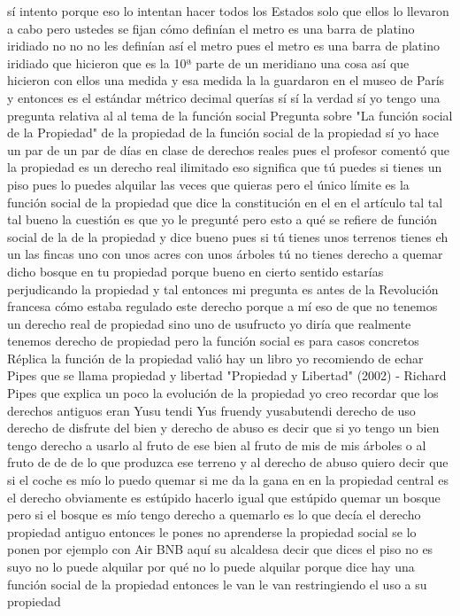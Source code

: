 sí intento porque eso lo intentan hacer todos los Estados solo que ellos lo llevaron a cabo pero ustedes se fijan cómo definían el metro
es una barra de platino iridiado no no no les definían así el metro pues el metro es una barra de platino iridiado que hicieron que es la 10ª parte de un meridiano
una cosa así que hicieron con ellos una medida y esa medida la la guardaron en el museo de París y entonces es el estándar métrico decimal
querías sí sí la verdad sí yo tengo una pregunta relativa al al tema de la función social
Pregunta sobre "La función social de la Propiedad"
de la propiedad de la función social de la propiedad sí yo hace un par de un par de días en clase de derechos reales
pues el profesor comentó que la propiedad es un derecho real ilimitado eso significa que tú puedes
si tienes un piso pues lo puedes alquilar las veces que quieras pero el único límite
es la función social de la propiedad que dice la constitución en el en el artículo tal tal tal bueno la cuestión es que yo le pregunté
pero esto a qué se refiere de función social de la de la propiedad y dice bueno pues si tú tienes unos terrenos tienes
eh un las fincas uno con unos acres con unos árboles tú no tienes derecho a quemar
dicho bosque en tu propiedad porque bueno en cierto sentido estarías perjudicando la propiedad y tal
entonces mi pregunta es antes de la Revolución francesa cómo estaba regulado este derecho
porque a mí eso de que no tenemos un derecho real de propiedad sino uno de usufructo
yo diría que realmente tenemos derecho de propiedad pero la función social es para casos concretos
Réplica
la función de la propiedad valió hay un libro yo recomiendo de echar Pipes que se llama propiedad y libertad
"Propiedad y Libertad" (2002) - Richard Pipes
que explica un poco la evolución de la propiedad yo creo recordar que los derechos antiguos eran Yusu tendi Yus fruendy yusabutendi
derecho de uso derecho de disfrute del bien y derecho de abuso es decir que si yo tengo un bien
tengo derecho a usarlo al fruto de ese bien al fruto de mis de mis árboles o al fruto de de de lo que produzca ese terreno
y al derecho de abuso quiero decir que si el coche es mío lo puedo quemar si me da la gana
en en la propiedad central es el derecho obviamente es estúpido hacerlo igual que estúpido quemar un bosque
pero si el bosque es mío tengo derecho a quemarlo es lo que decía el derecho propiedad antiguo entonces le pones no aprenderse la propiedad social
se lo ponen por ejemplo con Air BNB aquí su alcaldesa decir que dices el piso no es suyo no lo puede alquilar
por qué no lo puede alquilar porque dice hay una función social de la propiedad entonces le van le van restringiendo el uso a su propiedad
